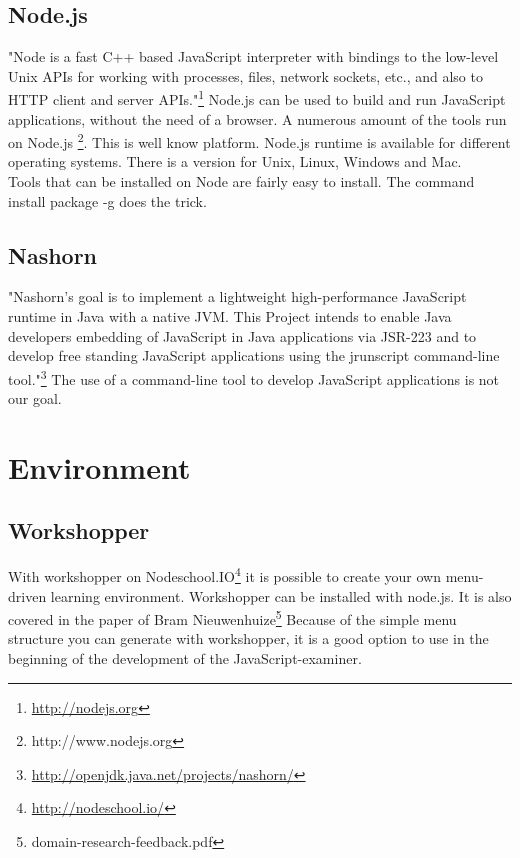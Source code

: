 \documentclass{article}
\begin{document}
\subsection{Node.js}
"Node is a fast C++ based JavaScript interpreter with bindings to the low-level 
Unix APIs for working with processes, files, network sockets, etc., and also to 
HTTP client and server APIs."\footnote{\url{http://nodejs.org}}
Node.js can be used to build and run JavaScript applications, without the need of a browser.
A numerous amount of the tools run on Node.js \footnote{http://www.nodejs.org}. This is well know platform.
Node.js runtime is available for different operating systems.
There is a version for Unix, Linux, Windows and Mac.\\
Tools that can be installed on Node are fairly easy to install. The command install package -g does the trick.\\

\subsection{Nashorn}
"Nashorn's goal is to implement a lightweight high-performance JavaScript runtime in Java with a native JVM.
This Project intends to enable Java developers embedding of JavaScript in Java applications via JSR-223 and to develop 
free standing JavaScript applications using the jrunscript command-line tool."\footnote{\url{http://openjdk.java.net/projects/nashorn/}}
The use of a command-line tool to develop JavaScript applications is not our goal.

\section{Environment}
\subsection{Workshopper}
With workshopper on Nodeschool.IO\footnote{\url{http://nodeschool.io/}} it is possible to create your own menu-driven learning environment. 
Workshopper can be installed with node.js.
It is also covered in the paper of Bram Nieuwenhuize\footnote{domain-research-feedback.pdf}
Because of the simple menu structure you can generate with workshopper, it is a good option to use in 
the beginning of the development of the JavaScript-examiner.
\end{document}
